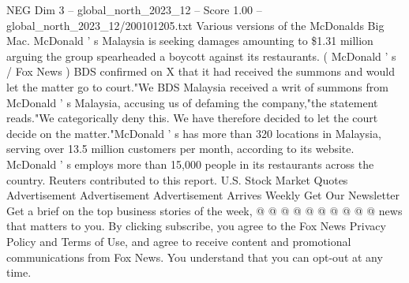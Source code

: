 \begin{textsample}{NEG Dim 3 – global\_north\_2023\_12 – Score 1.00 – global\_north\_2023\_12/200101205.txt}
Various versions of the McDonalds Big Mac.
McDonald ' s Malaysia is seeking damages amounting to \$1.31 million arguing the group spearheaded a boycott against its restaurants. ( McDonald ' s / Fox News ) BDS confirmed on X that it had received the summons and would let the matter go to court."We BDS Malaysia received a writ of summons from McDonald ' s Malaysia, accusing us of defaming the company,"the statement reads."We categorically deny this.
We have therefore decided to let the court decide on the matter."McDonald ' s has more than 320 locations in Malaysia, serving over 13.5 million customers per month, according to its website.
McDonald ' s employs more than 15,000 people in its restaurants across the country.
Reuters contributed to this report.
U.S.
Stock Market Quotes Advertisement Advertisement Advertisement Arrives Weekly Get Our Newsletter Get a brief on the top business stories of the week, @ @ @ @ @ @ @ @ @ @ news that matters to you.
By clicking subscribe, you agree to the Fox News Privacy Policy and Terms of Use, and agree to receive content and promotional communications from Fox News.
You understand that you can opt-out at any time.

\end{textsample}
